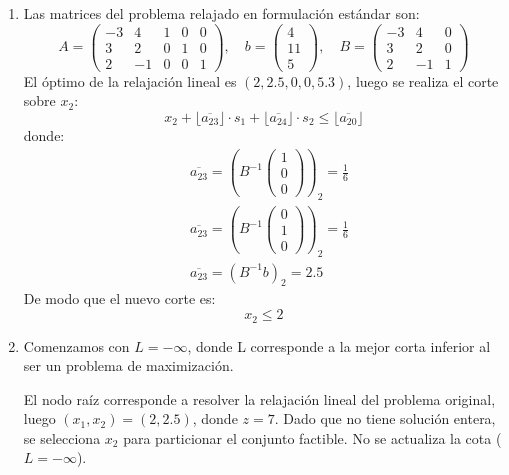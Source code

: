\begin{enumerate}
  \item[(c)] Las matrices del problema relajado en formulación estándar son:
  \[
  A=\begin{pmatrix}
    -3 & 4 &1 & 0 & 0 \\
    3 & 2 & 0 &1&0 \\
    2 & -1&0&0&1
\end{pmatrix}, \quad b= \begin{pmatrix}
    4 \\
    11 \\
    5 
\end{pmatrix}, \quad B=
    \begin{pmatrix}
        -3 & 4 &0  \\
        3 & 2 & 0  \\
        2 & -1&1
    \end{pmatrix}
  \]
  El óptimo de la relajación lineal es $(2,2.5,0,0,5.3)$, luego se realiza el corte sobre $x_2$:
  \begin{equation}
      x_2 + \lfloor\overline{a_{23}}\rfloor \cdot s_1+\lfloor\overline{a_{24}}\rfloor \cdot s_2 \leq \lfloor\overline{a_{20}}\rfloor
  \end{equation}
  donde:
  \begin{align}
     & \overline{a_{23}}=\left(B^{-1}\begin{pmatrix}
          1  \\ 0 \\ 0
      \end{pmatrix} \right)_2 =\frac{1}{6} \\
    & \overline{a_{23}}=\left(B^{-1}\begin{pmatrix}
          0  \\ 1 \\ 0
    \end{pmatrix} \right)_2 =\frac{1}{6} \\
    & \overline{a_{23}}=\left(B^{-1}b \right)_2 =2.5
  \end{align}
De modo que el nuevo corte es:
\begin{equation}
    x_2 \leq 2
\end{equation}
  
  \item[(d)] Comenzamos con $L=-\infty$, donde L corresponde a la mejor corta inferior al ser un problema de maximización.
  
  El nodo raíz corresponde a resolver la relajación lineal del problema original, luego $(x_1, x_2)=(2,2.5)$, donde $z=7$. Dado que no tiene solución entera, se selecciona $x_2$ para particionar el conjunto factible. No se actualiza la cota ($L=-\infty$).


\end{enumerate}
